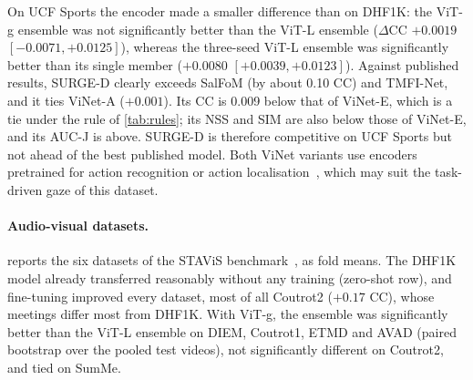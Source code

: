 On UCF Sports the encoder made a smaller difference than on DHF1K: the \acrshort{ViT}-g
ensemble was not significantly better than the \acrshort{ViT}-L ensemble
($\Delta$\acrshort{CC} $+0.0019$ $[-0.0071, +0.0125]$), whereas the three-seed \acrshort{ViT}-L
ensemble was significantly better than its single member ($+0.0080$
$[+0.0039, +0.0123]$). Against published results, SURGE-D clearly exceeds
SalFoM (by about 0.10 \acrshort{CC}) and TMFI-Net, and it ties ViNet-A
($+0.001$). Its \acrshort{CC} is 0.009 below that of ViNet-E, which is a tie
under the rule of \cref{tab:rules}; its \acrshort{NSS} and \acrshort{SIM} are
also below those of ViNet-E, and its \acrshort{AUC-J} is above. SURGE-D is
therefore competitive on UCF Sports but not ahead of the
best published model. Both ViNet variants use encoders pretrained for action
recognition or action localisation~\cite{girmaji2025minimalistic}, which may
suit the task-driven gaze of this dataset.

\paragraph{Audio-visual datasets.}  reports the six datasets of the
STAViS benchmark~\cite{tsiami2020stavis}, as fold means. The DHF1K model already
transferred reasonably without any training (zero-shot row), and fine-tuning
improved every dataset, most of all Coutrot2 ($+0.17$ \acrshort{CC}), whose meetings
differ most from DHF1K. With \acrshort{ViT}-g, the ensemble was significantly better than
the \acrshort{ViT}-L ensemble on DIEM, Coutrot1, ETMD and AVAD (paired bootstrap over the
pooled test videos), not significantly different on Coutrot2, and tied on SumMe.

